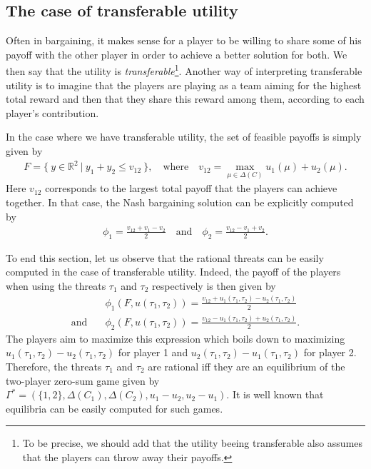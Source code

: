 \subsection{The case of transferable utility}



Often in bargaining, it makes sense for a player to be willing to share some of his payoff with the other player in order to achieve a better solution for both. We then say that the utility is \emph{transferable}\footnote{\footnotesize To be precise, we should add that the utility beeing transferable also assumes that the players can throw away their payoffs.}. Another way of interpreting transferable utility is to imagine that the players are playing as a team aiming for the highest total reward and then that they share this reward among them, according to each player's contribution.

In the case where we have transferable utility, the set of feasible payoffs is simply given by 
\begin{align*}
	F = \{ \ y \in \mathbb{R}^2 \ | \ y_1 + y_2 \leq v_{12} \ \}, \quad \text{where} \quad v_{12} = \max_{\mu \in \Delta(C)} u_1(\mu) + u_2(\mu).
\end{align*}
Here $v_{12}$ corresponds to the largest total payoff that the players can achieve together. In that case, the Nash bargaining solution can be explicitly computed by
\begin{align*}
	\phi_1 = \frac{v_{12} + v_1 - v_2}{2} \quad \text{and} \quad \phi_2 = \frac{v_{12} - v_1 + v_2}{2}.
\end{align*}

To end this section, let us observe that the rational threats can be easily computed in the case of transferable utility. Indeed, the payoff of the players when using the threats $\tau_1$ and $\tau_2$ respectively is then given by
\begin{align*}
	&\phi_1(F, u(\tau_1, \tau_2)) = \frac{v_{12} + u_1(\tau_1, \tau_2) - u_2(\tau_1, \tau_2)}{2}\\ \text{and} \quad &\phi_2(F, u(\tau_1, \tau_2)) = \frac{v_{12} - u_1(\tau_1, \tau_2) + u_2(\tau_1, \tau_2)}{2}.
\end{align*}
The players aim to maximize this expression which boils down to maximizing $u_1(\tau_1, \tau_2) - u_2(\tau_1, \tau_2)$ for player 1 and $u_2(\tau_1, \tau_2) - u_1(\tau_1, \tau_2)$ for player 2. Therefore, the threats $\tau_1$ and $\tau_2$ are rational iff they are an equilibrium of the two-player zero-sum game given by $\Gamma^*=(\{1,2\}, \Delta(C_1), \Delta(C_2), u_1-u_2, u_2-u_1)$. It is well known that equilibria can be easily computed for such games.



